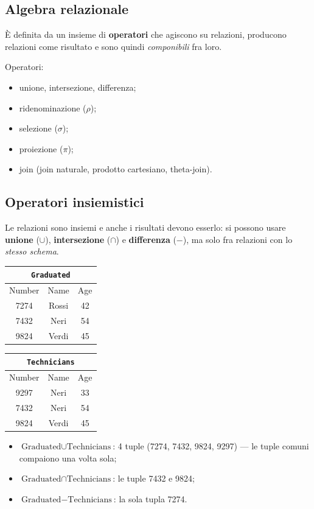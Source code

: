 \documentclass[a4paper,12pt]{article}
\begin{document}
\subsection{Algebra relazionale}

È definita da un insieme di \textbf{operatori} che agiscono su relazioni,
producono relazioni come risultato e sono quindi \emph{componibili} fra loro.

Operatori:
\begin{itemize}
  \item unione, intersezione, differenza;
  \item ridenominazione ($\rho$);
  \item selezione ($\sigma$);
  \item proiezione ($\pi$);
  \item join (join naturale, prodotto cartesiano, theta-join).
\end{itemize}

\subsection{Operatori insiemistici}

Le relazioni sono insiemi e anche i risultati devono esserlo: si possono usare
\textbf{unione} ($\cup$), \textbf{intersezione} ($\cap$) e \textbf{differenza}
($-$), ma solo fra relazioni con lo \emph{stesso schema}.

\begin{center}
\begin{tabular}{ccc}
\multicolumn{3}{c}{\texttt{Graduated}}\\ \hline
Number & Name & Age\\ \hline
7274 & Rossi & 42\\
7432 & Neri & 54\\
9824 & Verdi & 45\\ \hline
\end{tabular}
\qquad
\begin{tabular}{ccc}
\multicolumn{3}{c}{\texttt{Technicians}}\\ \hline
Number & Name & Age\\ \hline
9297 & Neri & 33\\
7432 & Neri & 54\\
9824 & Verdi & 45\\ \hline
\end{tabular}
\end{center}

\begin{itemize}
  \item $\text{Graduated} \cup \text{Technicians}$: 4 tuple (7274, 7432, 9824,
    9297) --- le tuple comuni compaiono una volta sola;
  \item $\text{Graduated} \cap \text{Technicians}$: le tuple 7432 e 9824;
  \item $\text{Graduated} - \text{Technicians}$: la sola tupla 7274.
\end{itemize}
\end{document}
